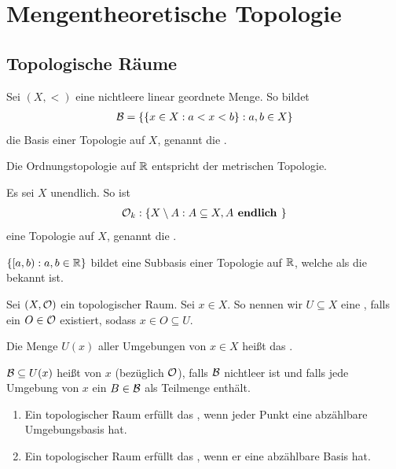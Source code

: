\documentclass{report}
\begin{document}

\tableofcontents
\part{Mengentheoretische Topologie}
\chapter{Topologische Räume}
\begin{proposition}
	Sei $(X, <)$ eine nichtleere linear geordnete Menge. So bildet
	\begin{align*}
		\mathcal{B} = \qty{\qty{x \in X : a < x < b} : a,b \in X}
	\end{align*}
	die Basis einer Topologie auf $X$, genannt die .
\end{proposition}
\begin{theorem}
	Die Ordnungstopologie auf $\mathbb{R}$ entspricht der metrischen Topologie.
\end{theorem}
\begin{proposition}
	Es sei $X$ unendlich. So ist
	\begin{align*}
		\mathcal{O}_k : \qty{X \setminus A : A \subseteq X, A \textbf{ endlich }}
	\end{align*}
	eine Topologie auf $X$, genannt die .
\end{proposition}
\begin{proposition}
	$\qty{[a,b) : a,b \in \mathbb{R}}$ bildet eine Subbasis einer Topologie auf $\mathbb{R}$, welche als die  bekannt ist.
\end{proposition}
\begin{definition}
	Sei $(X, \mathcal{O})$ ein topologischer Raum. Sei $x \in X$. So nennen wir $U \subseteq X$ eine , falls ein $O \in \mathcal{O}$ existiert, sodass $x \in O \subseteq U$.
\end{definition}
\begin{definition}
	Die Menge $U(x)$ aller Umgebungen von $x \in X$ heißt das .
\end{definition}
\begin{definition}
	$\mathcal{B} \subseteq U(x)$ heißt  von $x$ (bezüglich $\mathcal{O}$), falls $\mathcal{B}$ nichtleer ist und falls jede Umgebung von $x$ ein $B \in \mathcal{B}$ als Teilmenge enthält.
\end{definition}
\begin{definition}
	\begin{enumerate}
		\item Ein topologischer Raum erfüllt das , wenn jeder Punkt eine abzählbare Umgebungsbasis hat.
		\item Ein topologischer Raum erfüllt das , wenn er eine abzählbare Basis hat.
	\end{enumerate}
\end{definition}
\end{document}

